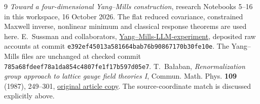 \begin{thebibliography}{9}
\emph{Toward a four-dimensional Yang--Mills construction},
research Notebooks 5--16 in this workspace, 16 October 2026.
The flat reduced covariance, constrained Maxwell inverse,
nonlinear minimum and classical response theorems are used here.
E.~Sussman and collaborators,
\href{https://github.com/ethanwsussman/Yang--Mills-LLM-experiment}{Yang--Mills-LLM-experiment},
deposited raw accounts at commit
\texttt{e392ef45013a581664bab76b90867170b30fe10e}.
The Yang--Mills files are unchanged at checked commit
\texttt{785a68fdeef78a1da854c4807fe1f17b597d05e7}.
T.~Ba\l aban, \emph{Renormalization group approach to lattice gauge
field theories I}, Commun. Math. Phys. \textbf{109} (1987), 249--301,
\href{https://scispace.com/pdf/renormalization-group-approach-to-lattice-gauge-field-3ygai0vxt1.pdf}{original article copy}.
The source-coordinate match is discussed explicitly above.
\end{thebibliography}

